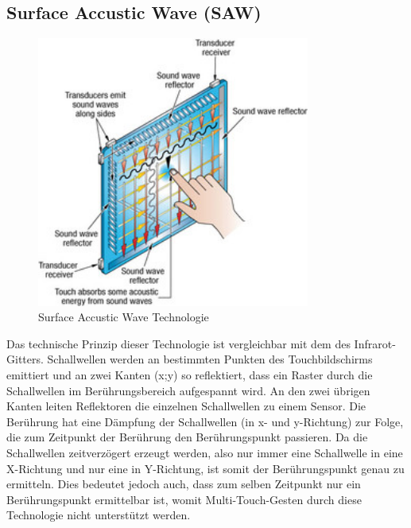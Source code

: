 \documentclass[12pt,oneside,a4paper,bibtotoc,liststotoc]{scrreprt}
\begin{document}
\subsection{Surface Accustic Wave (SAW)}
\begin{figure}[H]
  \begin{centering}
    \includegraphics[width=0.8\textwidth]{img/surface_accustic_wave.png}
    \caption{Surface Accustic Wave Technologie \cite[vgl. Surface-Acoustic-Wave-Saw]{002}}
    \label{surface_accustic_wave}
  \end{centering}
\end{figure}
Das technische Prinzip dieser Technologie ist vergleichbar mit dem des Infrarot-Gitters. Schallwellen werden an bestimmten Punkten des Touchbildschirms emittiert und an zwei Kanten (x;y) so reflektiert, dass ein Raster durch die Schallwellen im Berührungsbereich aufgespannt wird. An den zwei übrigen Kanten leiten Reflektoren die einzelnen Schallwellen zu einem Sensor. Die Berührung hat eine Dämpfung der Schallwellen (in x- und y-Richtung) zur Folge, die zum Zeitpunkt der Berührung den Berührungspunkt passieren. Da die Schallwellen zeitverzögert erzeugt werden, also nur immer eine Schallwelle in eine X-Richtung und nur eine in Y-Richtung, ist somit der Berührungspunkt genau zu ermitteln. Dies bedeutet jedoch auch, dass zum selben Zeitpunkt nur ein Berührungspunkt ermittelbar ist, womit Multi-Touch-Gesten durch diese Technologie nicht unterstützt werden.
\end{document}
